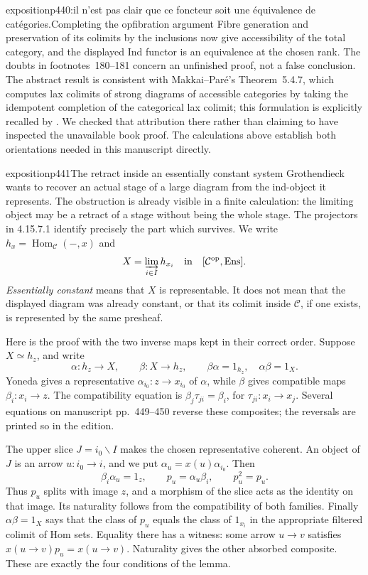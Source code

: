 \begin{dcomment}{exposition}{p440:il n'est pas clair que ce foncteur soit une équivalence de catégories.}{Completing the opfibration argument}
Fibre generation and preservation of its colimits by the inclusions now give accessibility of the total category, and the displayed Ind functor is an equivalence at the chosen rank. The doubts in footnotes~180--181 concern an unfinished proof, not a false conclusion. The abstract result is consistent with Makkai--Par\'e's Theorem~5.4.7, which computes lax colimits of strong diagrams of accessible categories by taking the idempotent completion of the categorical lax colimit; this formulation is explicitly recalled by \citet[Introduction]{PareRosicky2013}. We checked that attribution there rather than claiming to have inspected the unavailable book proof. The calculations above establish both orientations needed in this manuscript directly.
\end{dcomment}

\begin{dcomment}{exposition}{p441}{The retract inside an essentially constant system}
Grothendieck wants to recover an actual stage of a large diagram from the ind-object it represents. The obstruction is already visible in a finite calculation: the limiting object may be a retract of a stage without being the whole stage. The projectors in 4.15.7.1 identify precisely the part which survives. We write $h_x=\operatorname{Hom}_{\mathcal C}(-,x)$ and
\[
X=\varinjlim_{i\in I}h_{x_i}
\quad\hbox{in}\quad [\mathcal C^{\mathrm{op}},\mathrm{Ens}].
\]
\emph{Essentially constant} means that $X$ is representable. It does not mean that the displayed diagram was already constant, or that its colimit inside $\mathcal C$, if one exists, is represented by the same presheaf.

Here is the proof with the two inverse maps kept in their correct order. Suppose $X\simeq h_z$, and write
\[
\alpha:h_z\longrightarrow X,\qquad
\beta:X\longrightarrow h_z,\qquad
\beta\alpha=1_{h_z},\quad\alpha\beta=1_X.
\]
Yoneda gives a representative $\alpha_{i_0}:z\to x_{i_0}$ of $\alpha$, while $\beta$ gives compatible maps $\beta_i:x_i\to z$. The compatibility equation is
$\beta_j\tau_{ji}=\beta_i$, for $\tau_{ji}:x_i\to x_j$.
Several equations on manuscript pp.~449--450 reverse these composites; the reversals are printed so in the edition.

The upper slice $J=i_0\backslash I$ makes the chosen representative coherent. An object of $J$ is an arrow $u:i_0\to i$, and we put $\alpha_u=x(u)\alpha_{i_0}$. Then
\[
\beta_i\alpha_u=1_z,\qquad p_u=\alpha_u\beta_i,\qquad p_u^2=p_u.
\]
Thus $p_u$ splits with image $z$, and a morphism of the slice acts as the identity on that image. Its naturality follows from the compatibility of both families. Finally $\alpha\beta=1_X$ says that the class of $p_u$ equals the class of $1_{x_i}$ in the appropriate filtered colimit of Hom sets. Equality there has a witness: some arrow $u\to v$ satisfies $x(u\to v)p_u=x(u\to v)$. Naturality gives the other absorbed composite. These are exactly the four conditions of the lemma.


\end{dcomment}
